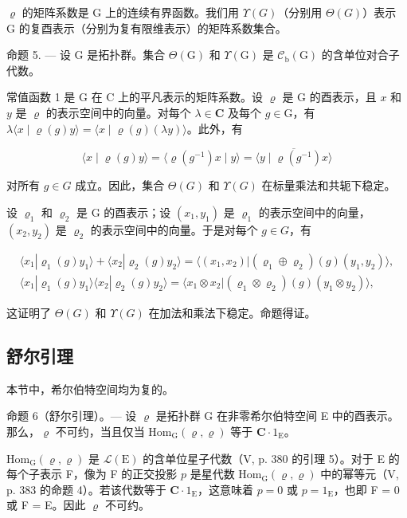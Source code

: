 \(\varrho\) 的矩阵系数是 G 上的连续有界函数。我们用 \(\Upsilon(G)\)（分别用 \(\Theta(G)\)）表示 G 的复酉表示（分别为复有限维表示）的矩阵系数集合。

命题 5. — 设 G 是拓扑群。集合 \(\Theta(\mathrm{G})\) 和 \(\Upsilon(\mathrm{G})\) 是 \(\mathcal{C}_{\mathrm{b}}(\mathrm{G})\) 的含单位对合子代数。

常值函数 1 是 G 在 C 上的平凡表示的矩阵系数。设 \(\varrho\) 是 G 的酉表示，且 \(x\) 和 \(y\) 是 \(\varrho\) 的表示空间中的向量。对每个 \(\lambda \in \mathbf{C}\) 及每个 \(g \in \mathrm{G}\)，有 \(\lambda \langle x \mid \varrho(g)y \rangle = \langle x \mid \varrho(g)(\lambda y) \rangle\)。此外，有

\[
\langle x \mid \varrho (g) y \rangle = \langle \varrho (g ^ {- 1}) x \mid y \rangle = \overline {{\langle y \mid \varrho (g ^ {- 1}) x \rangle}}
\]

对所有 \(g \in G\) 成立。因此，集合 \(\Theta(G)\) 和 \(\Upsilon(G)\) 在标量乘法和共轭下稳定。

设 \(\varrho_{1}\) 和 \(\varrho_{2}\) 是 G 的酉表示；设 \((x_{1}, y_{1})\) 是 \(\varrho_{1}\) 的表示空间中的向量，\((x_{2}, y_{2})\) 是 \(\varrho_{2}\) 的表示空间中的向量。于是对每个 \(g \in G\)，有

\[
\begin{array}{c} \langle x _ {1}   |   \varrho_ {1} (g) y _ {1} \rangle + \langle x _ {2}   |   \varrho_ {2} (g) y _ {2} \rangle = \langle (x _ {1}, x _ {2})   |   (\varrho_ {1} \oplus \varrho_ {2}) (g) (y _ {1}, y _ {2}) \rangle , \\ \langle x _ {1}   |   \varrho_ {1} (g) y _ {1} \rangle \langle x _ {2}   |   \varrho_ {2} (g) y _ {2} \rangle = \langle x _ {1} \otimes x _ {2}   |   (\varrho_ {1} \otimes \varrho_ {2}) (g) (y _ {1} \otimes y _ {2}) \rangle , \end{array}
\]

这证明了 \(\Theta(G)\) 和 \(\Upsilon(G)\) 在加法和乘法下稳定。命题得证。

\subsection{舒尔引理}

本节中，希尔伯特空间均为复的。

命题 6（舒尔引理）。--- 设 \(\varrho\) 是拓扑群 G 在非零希尔伯特空间 E 中的酉表示。那么，\(\varrho\) 不可约，当且仅当 \(\mathrm{Hom}_{\mathrm{G}}(\varrho, \varrho)\) 等于 \(\mathbf{C} \cdot 1_{\mathrm{E}}\)。

\(\mathrm{Hom}_{\mathrm{G}}(\varrho, \varrho)\) 是 \(\mathcal{L}(\mathrm{E})\) 的含单位星子代数（V, p. 380 的引理 5）。对于 E 的每个子表示 F，像为 F 的正交投影 \(p\) 是星代数 \(\mathrm{Hom}_{\mathrm{G}}(\varrho, \varrho)\) 中的幂等元（V, p. 383 的命题 4）。若该代数等于 \(\mathbf{C} \cdot 1_{\mathrm{E}}\)，这意味着 \(p = 0\) 或 \(p = 1_{\mathrm{E}}\)，也即 F = 0 或 F = E。因此 \(\varrho\) 不可约。

